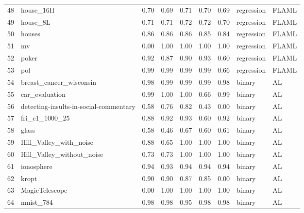 \begin{table*}
\begin{tabular}{lllllllll}
48 & house\_16H                                  & 0.70 & 0.69 & 0.71 & 0.70 & 0.69 & regression  & FLAML            \\
49 & house\_8L                                   & 0.71 & 0.71 & 0.72 & 0.72 & 0.70 & regression  & FLAML            \\
50 & houses                                      & 0.86 & 0.86 & 0.86 & 0.85 & 0.84 & regression  & FLAML            \\
51 & mv                                          & 0.00 & 1.00 & 1.00 & 1.00 & 1.00 & regression  & FLAML            \\
52 & poker                                       & 0.92 & 0.87 & 0.90 & 0.93 & 0.60 & regression  & FLAML            \\
53 & pol                                         & 0.99 & 0.99 & 0.99 & 0.99 & 0.66 & regression  & FLAML            \\
54 & breast\_cancer\_wisconsin                   & 0.98 & 0.99 & 0.99 & 0.99 & 0.98 & binary      & AL               \\
55 & car\_evaluation                             & 0.99 & 1.00 & 1.00 & 0.66 & 0.99 & binary      & AL               \\
56 & detecting-insults-in-social-commentary      & 0.58 & 0.76 & 0.82 & 0.43 & 0.00 & binary      & AL               \\
57 & fri\_c1\_1000\_25                           & 0.88 & 0.92 & 0.93 & 0.60 & 0.92 & binary      & AL               \\
58 & glass                                       & 0.58 & 0.46 & 0.67 & 0.60 & 0.61 & binary      & AL               \\
59 & Hill\_Valley\_with\_noise                   & 0.88 & 0.65 & 1.00 & 1.00 & 1.00 & binary      & AL               \\
60 & Hill\_Valley\_without\_noise                & 0.73 & 0.73 & 1.00 & 1.00 & 1.00 & binary      & AL               \\
61 & ionosphere                                  & 0.94 & 0.93 & 0.94 & 0.94 & 0.94 & binary      & AL               \\
62 & kropt                                       & 0.90 & 0.90 & 0.87 & 0.85 & 0.00 & binary      & AL               \\
63 & MagicTelescope                              & 0.00 & 1.00 & 1.00 & 1.00 & 1.00 & binary      & AL               \\
64 & mnist\_784                                  & 0.98 & 0.98 & 0.95 & 0.98 & 0.98 & binary      & AL               \\

\end{tabular}
\end{table*}
